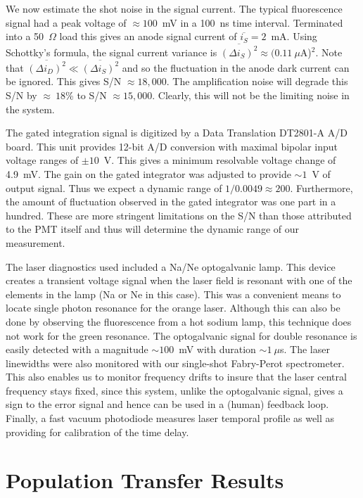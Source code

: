 We now estimate the shot noise in the signal current.  The typical
fluorescence signal had a peak voltage of $\approx 100$~mV in a 100~ns time
interval.  Terminated into a 50~$\Omega$ load this gives an anode signal current
of $\overline{i_S} = 2$~mA. Using Schottky's formula, the signal current
variance is $\overline{(\Delta i_S)^2} \approx (0.11~\mu$A)$^2$.  Note that
$\overline{(\Delta i_D)^2} \ll \overline{(\Delta i_S)^2}$ and so the fluctuation
in the anode dark current can be ignored. This gives S/N $\approx 18,000$.  The
amplification noise will degrade this S/N by $\approx~18$\% to S/N $\approx
15,000$.  Clearly, this will not be the limiting noise in the system.

The gated integration signal is digitized by a Data Translation
DT2801-A A/D board.  This unit provides 12-bit A/D conversion with maximal
bipolar input voltage ranges of $\pm 10$~V.  This gives a minimum resolvable
voltage change of 4.9~mV.  The gain on the gated integrator was adjusted to
provide $\sim 1$~V of output signal.  Thus we expect a dynamic range of
$1/0.0049 \approx 200$.  Furthermore, the amount of fluctuation observed in the
gated integrator was one part in a hundred.  These are more stringent
limitations on the S/N than those attributed to the PMT itself and thus will
determine the dynamic range of our measurement.

The laser diagnostics used included a Na/Ne optogalvanic lamp.  This device
creates a transient voltage signal when the laser field is resonant with one of
the elements in the lamp (Na or Ne in this case).  This was a convenient means to
locate single photon resonance for the orange laser. Although this can also be
done by observing the fluorescence from a hot sodium lamp, this technique does
not work for the green resonance.  The optogalvanic signal for double resonance
is easily detected with a magnitude $\sim 100$~mV with duration $ \sim 1~\mu$s.
The laser linewidths were also monitored with our single-shot Fabry-Perot
spectrometer.  This also enables us to monitor frequency drifts to insure that
the laser central frequency stays fixed, since this system, unlike the
optogalvanic signal, gives a sign to the error signal and hence can be used in a
(human) feedback loop.  Finally, a fast vacuum photodiode measures laser
temporal profile as well as providing for calibration of the time delay.

\section{Population Transfer Results}
\hspace{\parindent}

